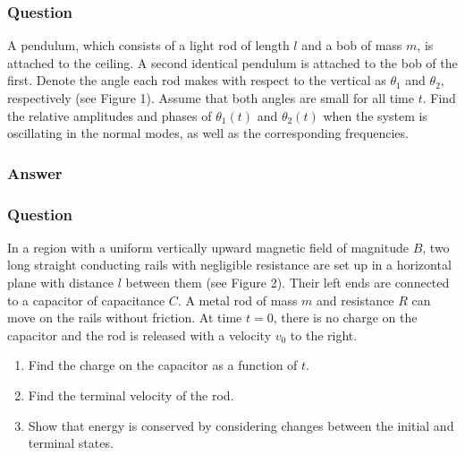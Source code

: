 \subsubsection{Question}

A pendulum, which consists of a light rod of length $l$ and a bob of mass $m$, is attached to the ceiling. A second identical pendulum is attached to the bob of the first. Denote the angle each rod makes with respect to the vertical as $\theta_1$ and $\theta_2$, respectively (see Figure 1). Assume that both angles are small for all time $t$. Find the relative amplitudes and phases of $\theta_1(t)$ and $\theta_2(t)$ when the system is oscillating in the normal modes, as well as the corresponding frequencies.

\subsubsection{Answer}


\subsubsection{Question}
In a region with a uniform vertically upward magnetic field of magnitude $B$, two long straight conducting rails with negligible resistance are set up in a horizontal plane with distance $l$ between them (see Figure 2). Their left ends are connected to a capacitor of capacitance $C$. A metal rod of mass $m$ and resistance $R$ can move on the rails without friction. At time $t = 0$, there is no charge on the capacitor and the rod is released with a velocity $v_0$ to the right.
\begin{enumerate}
	\item Find the charge on the capacitor as a function of $t$.
	\item Find the terminal velocity of the rod.
	\item Show that energy is conserved by considering changes between the initial and terminal states.
\end{enumerate}

